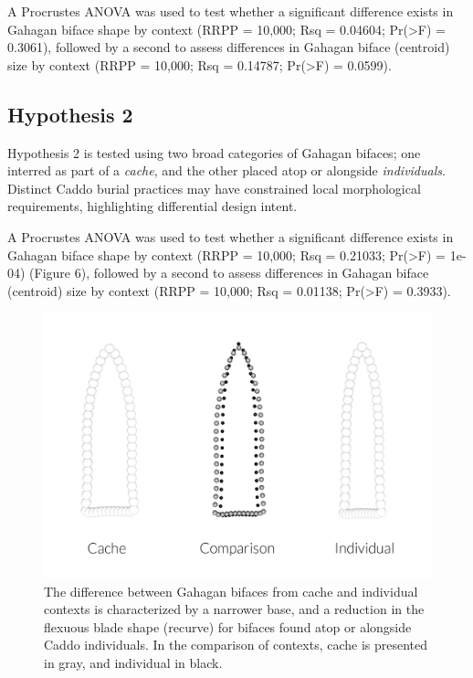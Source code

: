 \documentclass[]{interact}
\theoremstyle{plain}%
\theoremstyle{definition}
\theoremstyle{remark}
\begin{document}
A Procrustes ANOVA was used to test whether a significant difference
exists in Gahagan biface shape by context (RRPP = 10,000; Rsq = 0.04604;
Pr(\textgreater F) = 0.3061), followed by a second to assess differences
in Gahagan biface (centroid) size by context (RRPP = 10,000; Rsq =
0.14787; Pr(\textgreater F) = 0.0599).

\hypertarget{hypothesis-2-1}{%
\subsection{Hypothesis 2}\label{hypothesis-2-1}}

Hypothesis 2 is tested using two broad categories of Gahagan bifaces;
one interred as part of a \emph{cache}, and the other placed atop or
alongside \emph{individuals}. Distinct Caddo burial practices may have
constrained local morphological requirements, highlighting differential
design intent.

A Procrustes ANOVA was used to test whether a significant difference
exists in Gahagan biface shape by context (RRPP = 10,000; Rsq = 0.21033;
Pr(\textgreater F) = 1e-04) (Figure 6), followed by a second to assess
differences in Gahagan biface (centroid) size by context (RRPP = 10,000;
Rsq = 0.01138; Pr(\textgreater F) = 0.3933).

\begin{figure}

{\centering \includegraphics[width=1\linewidth]{img/fig05} 

}

\caption{The difference between Gahagan bifaces from cache and individual contexts is characterized by a narrower base, and a reduction in the flexuous blade shape (recurve) for bifaces found atop or alongside Caddo individuals. In the comparison of contexts, cache is presented in gray, and individual in black.}\label{fig:mshape.bpractice}
\end{figure}
\end{document}
